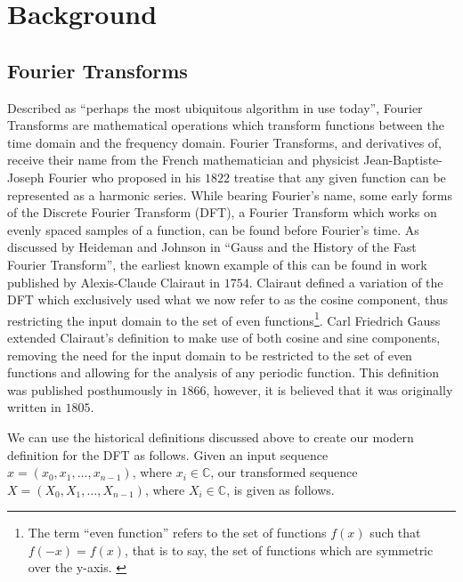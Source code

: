 \section{Background}
\subsection{Fourier Transforms}
Described as ``perhaps the most ubiquitous algorithm in use today''\cite{Top10Algos},
Fourier Transforms are mathematical operations which transform functions between 
the time domain and the frequency domain.
Fourier Transforms, and derivatives of, receive their name from the French 
mathematician and physicist Jean-Baptiste-Joseph Fourier who proposed in his 
$1822$\cite{Fourier1822} treatise that any given function can be represented as 
a harmonic series.\cite{Saribulut2013} 
While bearing Fourier's name, some early forms of the Discrete Fourier 
Transform (DFT), a Fourier Transform which works on evenly spaced samples of a 
function, can be found before Fourier's time.
As discussed by Heideman and Johnson in ``Gauss and the History of the Fast 
Fourier Transform''\cite{Heideman1985}, the earliest known example of this can 
be found in work published by Alexis-Claude Clairaut in $1754$\cite{Clairaut1754}.
Clairaut defined a variation of the DFT which exclusively used what we now refer 
to as the cosine component, thus restricting the input domain to the set of 
even functions\footnote{The term ``even function'' refers to the set of 
functions $f(x)$ such that $f(-x)=f(x)$, that is to say, the set of functions 
which are symmetric over the y-axis.  \cite{Gelfand1990}\cite{Tolstov1962}}.\cite{Heideman1985}
Carl Friedrich Gauss extended Clairaut's definition to make use of both cosine 
and sine components, removing the need for the input domain to be restricted 
to the set of even functions and allowing for the analysis of any periodic 
function.\cite{Gauss1866}\cite{Heideman1985}
This definition was published posthumously in $1866$, however, it is believed 
that it was originally written in $1805$.\cite{Heideman1985} 

We can use the historical definitions discussed above to create our modern 
definition for the DFT as follows.
Given an input sequence $x = 
        (x_0,x_1,\dots,x_{n-1})$,
            where $x_i\in\mathbb{C}
            $,
our transformed sequence $X =
        (X_0,X_1,\dots,X_{n-1})$,
            where $X_i\in\mathbb{C}
            $,
is given as follows.

